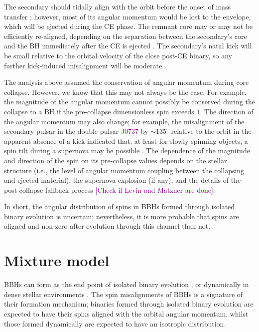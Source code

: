 \documentclass[modern,linenumbers]{aastex61}
\newcommand{\ilya}[1]{\textcolor{purple}{#1}}
\begin{document}
The secondary should tidally align with the orbit before the onset of
mass transfer
\citep[e.g.,][]{2000ApJ...541..319K,2013PhRvD..87j4028G}; however,
most of its angular momentum would be lost to the envelope, which will
be ejected during the CE phase.  The remnant core may or may not be
efficiently re-aligned, depending on the separation between the
secondary’s core and the BH immediately after the CE is ejected
\citep{2016MNRAS.462..844K}.  The secondary’s natal kick will be small
relative to the orbital velocity of the close post-CE binary, so any
further kick-induced misalignment will be moderate
\citep{2016ApJ...832L...2R}.

The analysis above assumed the conservation of angular momentum during
core collapse. However, we know that this may not always be the case.
For example, the magnitude of the angular momentum cannot possibly be
conserved during the collapse to a BH if the pre-collapse
dimensionless spin exceeds $1$.  The direction of the angular momentum
may also change; for example, the misalignment of the secondary pulsar
in the double pulsar \ilya{J0737} by $\sim 135^{\circ}$ relative to
the orbit in the apparent absence of a kick indicated that, at least
for slowly spinning objects, a spin tilt during a supernova may be
possible \citep{2011ApJ...742...81F}.  The dependence of the magnitude
and direction of the spin on its pre-collapse values depends on the
stellar structure (i.e., the level of angular momentum coupling
between the collapsing and ejected material), the supernova explosion
(if any), and the details of the post-collapse fallback process
\ilya{[Check if Levin and Matzner are done]}.

In short, the angular distribution of spins in \acp{BBH} formed
through isolated binary evolution is uncertain; nevertheless, it is
more probable that spins are aligned and non-zero after evolution
through this channel than not.  


\appendix

\section{Mixture model}

BBHs can form as the end point of isolated binary evolution \cite{refs}, or dynamically in dense stellar environments \cite{refs}. The spin misalignments of BBHs is a signature of their formation mechanism; binaries formed through isolated binary evolution are expected to have their spins aligned with the orbital angular momentum, whilst those formed dynamically are expected to have an isotropic distribution.
\end{document}
